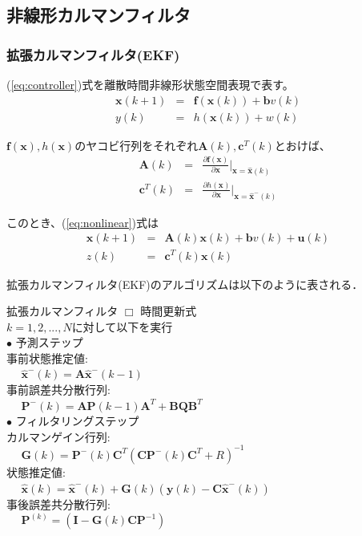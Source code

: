 \documentclass[twocolumn,oneside,a4paper]{article}
\begin{document}
\subsection{非線形カルマンフィルタ}
\subsubsection{拡張カルマンフィルタ(EKF)}
(\ref{eq:controller})式を離散時間非線形状態空間表現で表す。
\begin{eqnarray*}\label{eq:nonlinear}
\bm{x}(k+1) &=& \bm{f}(\bm{x}(k))+\bm{b}v(k)\\
y(k) &=& h(\bm{x}(k))+w(k)
\end{eqnarray*}

$\bm{f}(\bm{x}), h(\bm{x})$のヤコビ行列をそれぞれ$\bm{A}(k), \bm{c}^T(k)$とおけば、
\begin{eqnarray*}
\bm{A}(k) &=& \frac{\partial \bm{f}(\bm{x})}{\partial \bm{x}} \bigg| _{\bm{x}=\hat{\bm{x}}(k)}\\
\bm{c}^T(k) &=& \frac{\partial h(\bm{x})}{\partial \bm{x} } \bigg| _{\bm{x}=\hat{\bm{x}}^{-}(k)}
\end{eqnarray*}


このとき、(\ref{eq:nonlinear})式は
\begin{eqnarray*}
\bm{x}(k+1) &=& \bm{A}(k)\bm{x}(k) + \bm{b}v(k)+\bm{u}(k)\\
z(k) &=& \bm{c}^T(k)\bm{x}(k)
\end{eqnarray*}

拡張カルマンフィルタ(EKF)のアルゴリズムは以下のように表される．
  \begin{itembox}[l]{拡張カルマンフィルタ}
    $\Box$ 時間更新式\\
    $k=1,2,...,N$に対して以下を実行\\
     $\bullet$ 予測ステップ\\
     事前状態推定値: \\
     $\:\:\:\:\:\: \hat{\bm{x}}^{-}(k) = \bm{A}\hat{\bm{x}}^{-}(k-1)$\\
     事前誤差共分散行列: \\
     $\:\:\:\:\:\: \bm{P}^{-}(k)=\bm{A}\bm{P}(k-1)\bm{A}^{T}+\bm{BQ}\bm{B}^T$\\         
     $\bullet$ フィルタリングステップ\\
     カルマンゲイン行列: \\
     $\:\:\:\:\:\: \bm{G}(k)=\bm{P}^{-}(k)\bm{C}^T(\bm{C}\bm{P}^{-}(k)\bm{C}^{T}+R)^{-1}$\\
     状態推定値: \\
     $\:\:\:\:\:\: \hat{\bm{x}}(k) = \hat{\bm{x}}^{-}(k) + \bm{G}(k)(\bm{y}(k)-\bm{C}\hat{\bm{x}}^{-}(k))$\\
     事後誤差共分散行列: \\
     $\:\:\:\:\:\: \bm{P}^(k)=(\bm{I}-\bm{G}(k)\bm{C}\bm{P}^{-1})$
  \end{itembox}
\end{document}
